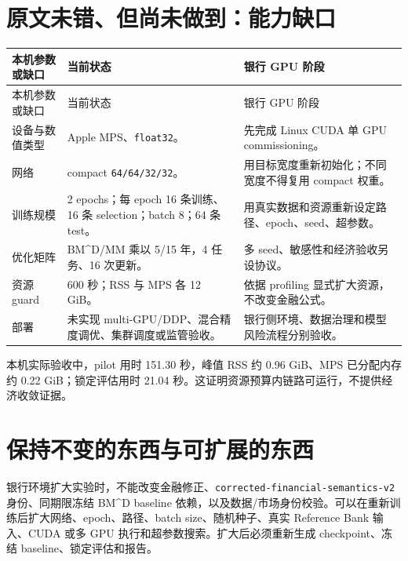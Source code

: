 \documentclass[UTF8,10pt,a4paper,fontset=fandol]{ctexart}
\begin{document}
\section{原文未错、但尚未做到：能力缺口}
\begin{longtable}{@{}P{29mm}P{64mm}P{63mm}@{}}
\toprule
本机参数或缺口 & 当前状态 & 银行 GPU 阶段 \\
\midrule
\endfirsthead
\toprule 本机参数或缺口 & 当前状态 & 银行 GPU 阶段 \\ \midrule
\endhead
设备与数值类型 & Apple MPS、\texttt{float32}。 & 先完成 Linux CUDA 单 GPU commissioning。 \\
网络 & compact \texttt{64/64/32/32}。 & 用目标宽度重新初始化；不同宽度不得复用 compact 权重。 \\
训练规模 & 2 epochs；每 epoch 16 条训练、16 条 selection；batch 8；64 条 test。 & 用真实数据和资源重新设定路径、epoch、seed、超参数。 \\
优化矩阵 & BM\textasciicircum D/MM 乘以 5/15 年，4 任务、16 次更新。 & 多 seed、敏感性和经济验收另设协议。 \\
资源 guard & 600 秒；RSS 与 MPS 各 12 GiB。 & 依据 profiling 显式扩大资源，不改变金融公式。 \\
部署 & 未实现 multi-GPU/DDP、混合精度调优、集群调度或监管验收。 & 银行侧环境、数据治理和模型风险流程分别验收。 \\
\bottomrule
\end{longtable}

本机实际验收中，pilot 用时 151.30 秒，峰值 RSS 约 0.96 GiB、MPS 已分配内存约 0.22 GiB；锁定评估用时 21.04 秒。这证明资源预算内链路可运行，不提供经济收敛证据。

\section{保持不变的东西与可扩展的东西}
银行环境扩大实验时，不能改变金融修正、\texttt{corrected-financial-semantics-v2} 身份、同期限冻结 BM\textasciicircum D baseline 依赖，以及数据/市场身份校验。可以在重新训练后扩大网络、epoch、路径、batch size、随机种子、真实 Reference Bank 输入、CUDA 或多 GPU 执行和超参数搜索。扩大后必须重新生成 checkpoint、冻结 baseline、锁定评估和报告。
\end{document}
